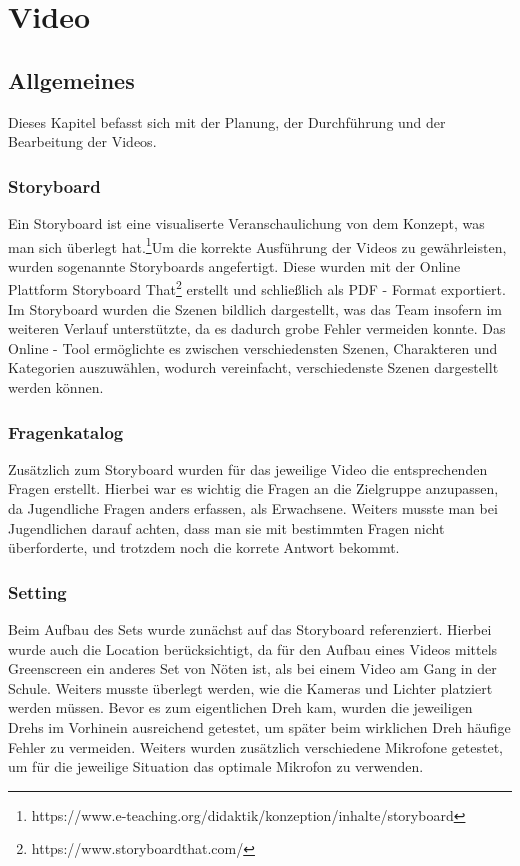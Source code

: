 \chapter{Video}
\section{Allgemeines}
\renewcommand{\kapitelautor}{Autor: Kerstin Schön}
Dieses Kapitel befasst sich mit der Planung, der Durchführung und der Bearbeitung der Videos. 

\subsection{Storyboard}
\renewcommand{\kapitelautor}{Autor: Kerstin Schön}
Ein Storyboard ist eine visualiserte Veranschaulichung von dem Konzept, was man sich überlegt hat.\footnote{\label{foot:1}https://www.e-teaching.org/didaktik/konzeption/inhalte/storyboard}Um die korrekte Ausführung der Videos zu gewährleisten, wurden sogenannte Storyboards angefertigt. Diese wurden mit der Online Plattform Storyboard That\footnote{\label{foot:2}https://www.storyboardthat.com/} erstellt und schließlich als PDF - Format exportiert.
Im Storyboard wurden die Szenen bildlich dargestellt, was das Team insofern im weiteren Verlauf unterstützte, da es dadurch grobe Fehler vermeiden konnte.
Das Online - Tool ermöglichte es zwischen verschiedensten Szenen, Charakteren und Kategorien auszuwählen, wodurch vereinfacht, verschiedenste Szenen dargestellt werden können.
 
\subsection{Fragenkatalog}
\renewcommand{\kapitelautor}{Autor: Kerstin Schön}
Zusätzlich zum Storyboard wurden für das jeweilige Video die entsprechenden Fragen erstellt. Hierbei war es wichtig die Fragen an die Zielgruppe anzupassen, da Jugendliche Fragen anders erfassen, als Erwachsene. Weiters musste man bei Jugendlichen darauf achten, dass man sie mit bestimmten Fragen nicht überforderte, und trotzdem noch die korrete Antwort bekommt.

\subsection{Setting}
\renewcommand{\kapitelautor}{Autor: Kerstin Schön}
Beim Aufbau des Sets wurde zunächst auf das Storyboard referenziert. Hierbei wurde auch die Location berücksichtigt, da für  den Aufbau eines Videos mittels Greenscreen ein anderes Set von Nöten ist, als bei einem Video am Gang in der Schule. Weiters musste überlegt werden, wie die Kameras und Lichter platziert werden müssen. Bevor es zum eigentlichen Dreh kam, wurden die jeweiligen Drehs im Vorhinein ausreichend getestet, um später beim wirklichen Dreh häufige Fehler zu vermeiden. Weiters wurden zusätzlich verschiedene Mikrofone getestet, um für die jeweilige Situation das optimale Mikrofon zu verwenden.

